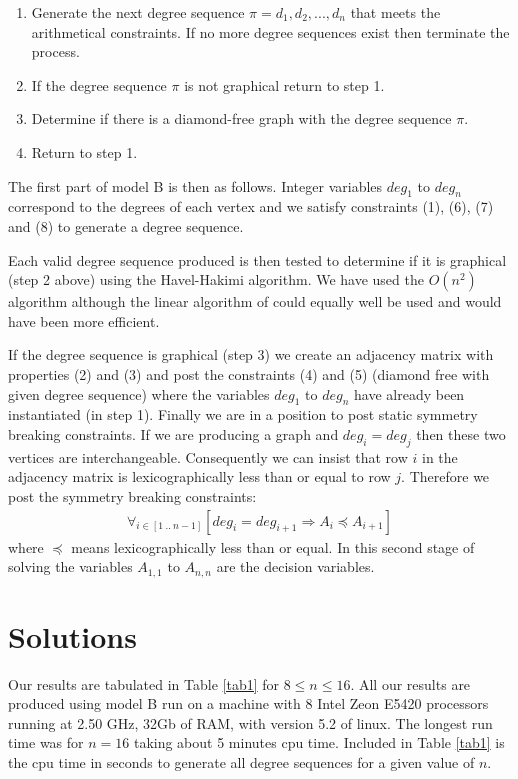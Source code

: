 \documentclass{l4proj}
\begin{document}
\begin{enumerate}
\item Generate the next degree sequence $\pi = d_{1},d_{2},...,d_{n}$ that meets the arithmetical constraints.
If no more degree sequences exist then terminate the process.
\vspace{-8pt}
\item If the degree sequence $\pi$ is not graphical return to step 1.
\vspace{-8pt}
\item Determine if there is a diamond-free graph with the degree sequence $\pi$.
\vspace{-8pt} 
\item Return to step 1.
\end{enumerate}

The first part of model B is then as follows. Integer variables $deg_1$ to $deg_n$ correspond to the
degrees of each vertex and we satisfy constraints (1), (6), (7) and (8) to generate a degree sequence.

Each valid degree sequence produced is then tested to determine if it is graphical (step 2 above) using the 
Havel-Hakimi algorithm. We have used the $O(n^{2})$ algorithm \cite{hh} although the linear algorithm of \cite{hh2} 
could equally well be used and would have been more efficient. 

If the degree sequence is graphical (step 3) we create an adjacency matrix with properties
(2) and (3) and post the constraints (4) and (5) (diamond free with given degree sequence) where the variables $deg_{1}$ to $deg_{n}$ 
have already been instantiated (in step 1).
Finally we are in a position to post static symmetry breaking constraints. If we are producing a graph
and $deg_{i} = deg_{j}$ then these two vertices are interchangeable. Consequently we can insist that row $i$ in
the adjacency matrix is lexicographically less than or equal to row $j$. Therefore we post the symmetry breaking constraints:
\begin{eqnarray}
\forall_{i \in [1~..~n-1]}[deg_{i} = deg_{i+1} \Rightarrow A_{i} \preceq A_{i+1}]
\end{eqnarray}
where $\preceq$ means lexicographically less than or equal. In this second stage of solving the variables 
$A_{1,1}$ to $A_{n,n}$ are the decision variables.

\chapter{Solutions}
\label{sec:solutions}
\vspace{-3mm}
Our results are tabulated in Table \ref{tab1} for $8 \leq n \leq 16$. 
All our results are produced using model B run on a machine with 8 Intel Zeon E5420 processors 
running at 2.50 GHz, 32Gb of RAM, with version 5.2 of linux. The longest run time was for $n = 16$ taking about 5
minutes cpu time. Included in Table \ref{tab1} is the cpu time in seconds to generate all degree sequences for a given value of $n$.
\end{document}
